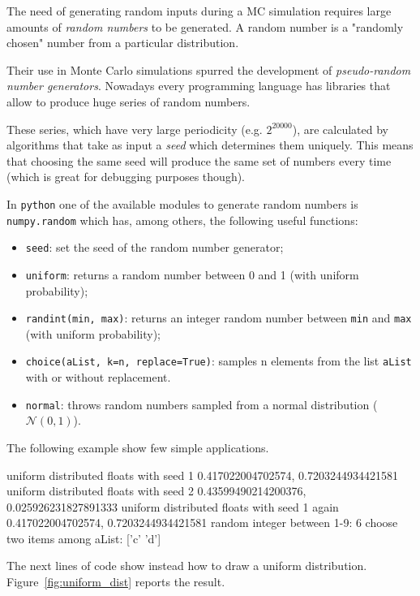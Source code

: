 The need of generating random inputs during a MC simulation requires large amounts of \emph{random numbers} to be generated.
A random number is a "randomly chosen" number from a particular distribution.

Their use in Monte Carlo simulations spurred the development of \emph{pseudo-random number generators}. Nowadays every programming language has libraries that allow to produce huge series of random numbers. 

These series, which have very large periodicity (e.g. \(2^{20000}\)), are calculated by algorithms that take as input a \emph{seed} which determines them uniquely. This means that choosing the same seed will produce the same set of numbers every time (which is great for debugging purposes though).

In \texttt{python} one of the available modules to generate random numbers is \texttt{numpy.random} which has, among others, the following useful functions:
\begin{itemize}
\tightlist
\item \texttt{seed}: set the seed of the random number generator;
\item \texttt{uniform}: returns a random number between 0 and 1 (with uniform probability);
\item \texttt{randint(min,\ max)}: returns an integer random number between \texttt{min} and \texttt{max} (with uniform probability);
\item \texttt{choice(aList,\ k=n, replace=True)}: samples n elements from the list \texttt{aList} with or without replacement.
\item \texttt{normal}: throws random numbers sampled from a normal distribution ($\mathcal{N}(0, 1)$).
\end{itemize}

The following example show few simple applications.

\begin{ioutput}
uniform distributed floats with seed 1
0.417022004702574, 0.7203244934421581
uniform distributed floats with seed 2
0.43599490214200376, 0.025926231827891333
uniform distributed floats with seed 1 again
0.417022004702574, 0.7203244934421581
random integer between 1-9: 6
choose two items among aList: ['c' 'd']
\end{ioutput}

The next lines of code show instead how to draw a uniform distribution. Figure~\ref{fig:uniform_dist} reports the result.

